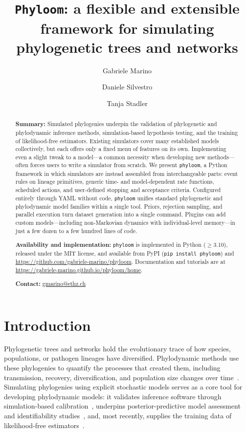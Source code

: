 \documentclass[11pt]{article}
\title{\texttt{Phyloom}: a flexible and extensible framework for simulating phylogenetic trees and networks}
\author[1,2]{Gabriele Marino}
\author[1,2]{Daniele Silvestro}
\author[1,2]{Tanja Stadler}
\affil[1]{Department of Biosystems Science and Engineering, ETH Zurich, Basel, Switzerland}
\affil[2]{SIB Swiss Institute of Bioinformatics, Basel, Switzerland}
\date{}
\begin{document}
\maketitle
\linenumbers

\begin{abstract}
  \noindent\textbf{Summary:} Simulated phylogenies underpin the validation of
  phylogenetic and phylodynamic inference methods, simulation-based hypothesis
  testing, and the training of likelihood-free estimators. Existing simulators
  cover many established models collectively, but each offers only a fixed menu
  of features on its own. Implementing even a slight tweak to a model---a common
  necessity when developing new methods---often forces users to write a
  simulator from scratch. We present \texttt{phyloom}, a Python framework in
  which simulators are instead assembled from interchangeable parts: event rules
  on lineage primitives, generic time- and model-dependent rate functions,
  scheduled actions, and user-defined stopping and acceptance criteria.
  Configured entirely through YAML without code, \texttt{phyloom} unifies
  standard phylogenetic and phylodynamic model families within a single
  tool. Priors, rejection sampling, and parallel execution turn dataset
  generation into a single command. Plugins can add custom
  models---including non-Markovian dynamics with individual-level
  memory---in just a few dozen to a few hundred lines of code.

  \medskip\noindent\textbf{Availability and implementation:} \texttt{phyloom} is
  implemented in Python ($\geq$3.10), released under the MIT license, and
  available from PyPI (\texttt{pip install phyloom}) and
  \url{https://github.com/gabriele-marino/phyloom}. Documentation and tutorials
  are at \url{https://gabriele-marino.github.io/phyloom/home}.

  \medskip\noindent\textbf{Contact:} \href{mailto:gmarino@ethz.ch}{gmarino@ethz.ch}
\end{abstract}

\section{Introduction}

Phylogenetic trees and networks hold the evolutionary trace of how species,
populations, or pathogen lineages have diversified. Phylodynamic methods
use these phylogenies to quantify the processes that created them, including
transmission, recovery, diversification, and population size changes over
time~\citep{stadler2024decoding}.
Simulating phylogenies using explicit stochastic models serves as a
core tool for developing phylodynamic models: it validates inference
software through simulation-based
calibration~\citep{talts2018sbc, mendes2025validate},
underpins posterior-predictive model
assessment~\citep{bollback2002adequacy, duchene2019phylodynadequacy}
and identifiability studies~\citep{louca2021identifiability}, and,
most recently, supplies the training data of likelihood-free
estimators~\citep{voznica2022phylodeep, lambert2023deep}.
\end{document}
